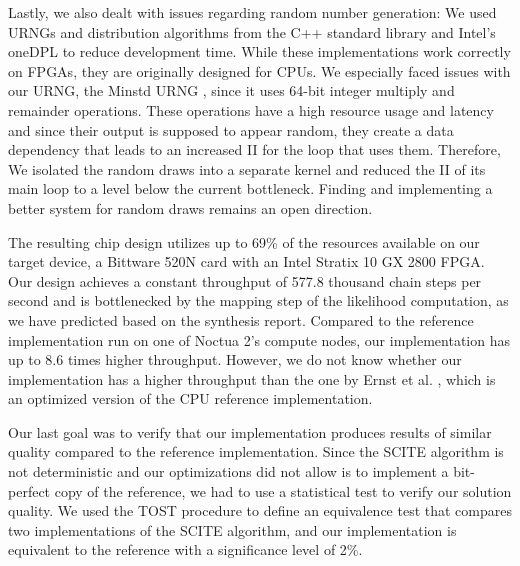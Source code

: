 Lastly, we also dealt with issues regarding random number generation: We used \acfp{URNG} and distribution algorithms from the C++ standard library and Intel's oneDPL to reduce development time. While these implementations work correctly on \acp{FPGA}, they are originally designed for \acp{CPU}. We especially faced issues with our \ac{URNG}, the Minstd \ac{URNG} \cite{park1988random}, since it uses 64-bit integer multiply and remainder operations. These operations have a high resource usage and latency and since their output is supposed to appear random, they create a data dependency that leads to an increased \acf{II} for the loop that uses them. Therefore, We isolated the random draws into a separate kernel and reduced the \ac{II} of its main loop to a level below the current bottleneck. Finding and implementing a better system for random draws remains an open direction.

The resulting chip design utilizes up to 69\% of the resources available on our target device, a Bittware 520N card with an Intel Stratix 10 GX 2800 \ac{FPGA}. Our design achieves a constant throughput of 577.8 thousand chain steps per second and is bottlenecked by the mapping step of the likelihood computation, as we have predicted based on the synthesis report. Compared to the reference implementation run on one of Noctua 2's compute nodes, our implementation has up to 8.6 times higher throughput. However, we do not know whether our implementation has a higher throughput than the one by Ernst et al. \cite{ernst2020Performance}, which is an optimized version of the \ac{CPU} reference implementation.

Our last goal was to verify that our implementation produces results of similar quality compared to the reference implementation. Since the \ac{SCITE} algorithm is not deterministic and our optimizations did not allow is to implement a bit-perfect copy of the reference, we had to use a statistical test to verify our solution quality. We used the \acf{TOST} procedure \cite{schuirmann1987comparison} to define an equivalence test that compares two implementations of the \ac{SCITE} algorithm, and our implementation is equivalent to the reference with a significance level of 2\%.

